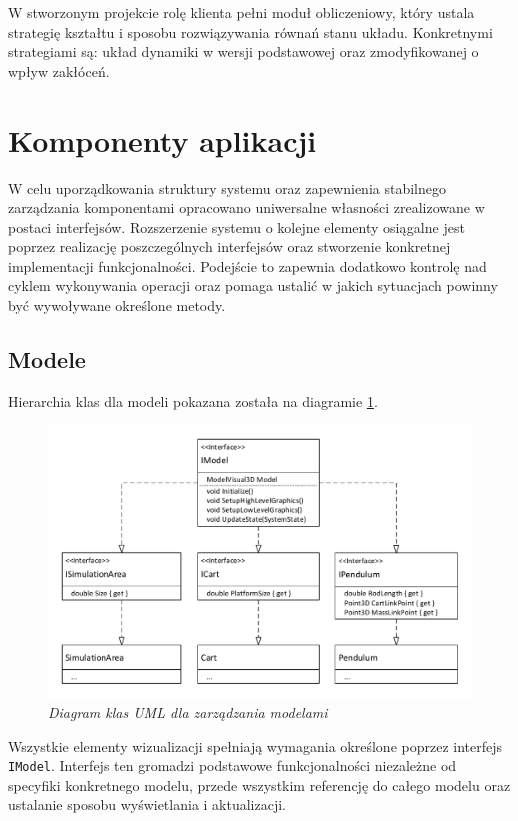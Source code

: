 \documentclass[12pt, twoside, openany]{report}
\theoremstyle{definition}
\begin{document}
W stworzonym projekcie rolę klienta pełni moduł obliczeniowy, który ustala strategię kształtu i sposobu rozwiązywania równań stanu układu. Konkretnymi strategiami są: układ dynamiki w wersji podstawowej oraz zmodyfikowanej o wpływ zakłóceń. 

\section{Komponenty aplikacji}
W celu uporządkowania struktury systemu oraz zapewnienia stabilnego zarządzania komponentami opracowano uniwersalne własności zrealizowane w postaci interfejsów. Rozszerzenie systemu o kolejne elementy osiągalne jest poprzez realizację poszczególnych interfejsów oraz stworzenie konkretnej implementacji funkcjonalności. Podejście to zapewnia dodatkowo kontrolę nad cyklem wykonywania operacji oraz pomaga ustalić w jakich sytuacjach powinny być wywoływane określone metody.

\subsection{Modele}
Hierarchia klas dla modeli pokazana została na diagramie \ref{IModel}.  

\begin{figure}[H]
	\centering
		\includegraphics[width = 400pt]{IModel} 
		\caption{\textit{Diagram klas UML dla zarządzania modelami}}
		\label{IModel}
\end{figure}

Wszystkie elementy wizualizacji spełniają wymagania określone poprzez interfejs \texttt{IModel}. Interfejs ten gromadzi podstawowe funkcjonalności niezależne od specyfiki konkretnego modelu, przede wszystkim referencję do całego modelu oraz ustalanie sposobu wyświetlania i aktualizacji. 
\end{document}

